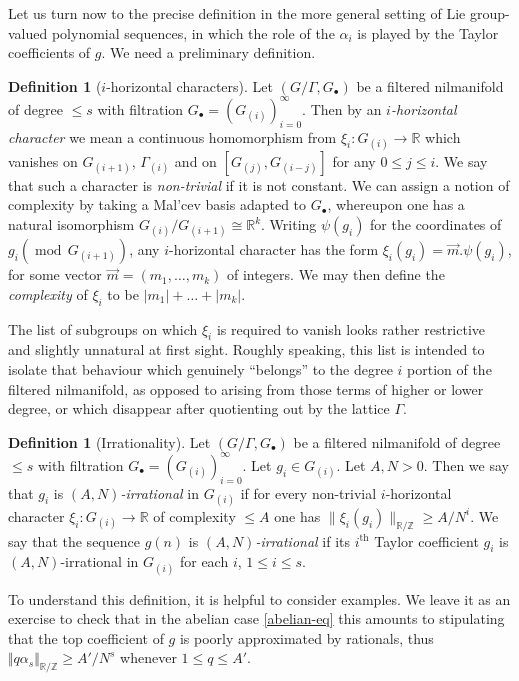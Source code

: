 \documentclass[11pt,reqno]{amsart}
\numberwithin{equation}{section}
\theoremstyle{plain}
\theoremstyle{definition}
\newtheorem{definition}[subsection]{Definition}
\renewcommand{\leq}{\leqslant}
\renewcommand{\geq}{\geqslant}
\newcommand{\md}[1]{\ensuremath{(\operatorname{mod}\, #1)}}
\newcommand\Z{\mathbb{Z}}
\newcommand\R{\mathbb{R}}
\newcommand\1{{\bf 1}}
\newcommand\2{{\bf 2}}
\begin{document}
Let us turn now to the precise definition in the more general setting of Lie group-valued polynomial sequences, in which the role of the $\alpha_i$ is played by the Taylor coefficients of $g$. We need a preliminary definition.

\begin{definition}[$i$-horizontal characters]\label{def-a4}
Let $(G/\Gamma, G_{\bullet})$ be a filtered nilmanifold of degree $\leq s$ with filtration $G_{\bullet} = (G_{(i)})_{i = 0}^{\infty}$. Then by an \emph{$i$-horizontal character} we mean a continuous homomorphism from $\xi_i : G_{(i)} \rightarrow \R$ which vanishes on $G_{(i+1)}$, $\Gamma_{(i)}$ and on $[G_{(j)},G_{(i-j)}]$ for any $0 \leq j \leq i$. We say that such a character is \emph{non-trivial} if it is not constant. We can assign a notion of complexity by taking a Mal'cev basis adapted to $G_{\bullet}$, whereupon one has a natural isomorphism $G_{(i)}/G_{(i+1)} \cong \R^k$. Writing $\psi(g_i)$ for the coordinates of $g_i\md{G_{(i+1)}}$, any $i$-horizontal character has the form $\xi_i(g_i) = \vec{m}. \psi(g_i)$, for some vector $\vec{m} = (m_1,\dots,m_k)$ of integers. We may then define the \emph{complexity} of $\xi_i$ to be $|m_1| + \dots + |m_k|$.
\end{definition}

The list of subgroups on which $\xi_i$ is required to vanish looks rather restrictive and slightly unnatural at first sight.  Roughly speaking, this list is intended to isolate that behaviour which genuinely ``belongs'' to the degree $i$ portion of the filtered nilmanifold, as opposed to arising from those terms of higher or lower degree, or which disappear after quotienting out by the lattice $\Gamma$.


\begin{definition}[Irrationality]\label{irrat-def}  Let $(G/\Gamma,G_\bullet)$ be a filtered nilmanifold of degree $\leq s$ with filtration $G_\bullet = (G_{(i)})_{i=0}^\infty$. Let $g_i \in G_{(i)}$. Let $A, N > 0$.  Then we say that $g_i$ is \emph{$(A,N)$-irrational} in $G_{(i)}$ if for every non-trivial $i$-horizontal character $\xi_i: G_{(i)} \to \R$ of complexity $\leq A$ one has $\| \xi_i(g_i)\|_{\R/\Z} \geq A / N^i$.
We say that the sequence $g(n)$ is \emph{$(A,N)$-irrational} if its $i^{\operatorname{th}}$ Taylor coefficient $g_i$ is $(A,N)$-irrational in $G_{(i)}$ for each $i$, $1 \leq i \leq s$.
 \end{definition}

To understand this definition, it is helpful to consider examples. We leave it as an exercise to check that in the abelian case \eqref{abelian-eq} this amounts to stipulating that the top coefficient of $g$ is poorly approximated by rationals, thus $\Vert q\alpha_s \Vert_{\R/\Z} \geq A'/N^s$ whenever $1 \leq q \leq A'$. 
\end{document}
